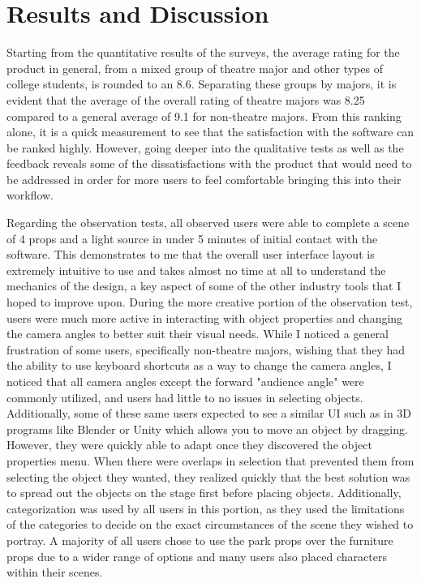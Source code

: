 \documentclass[10pt,twocolumn]{article}
\begin{document}
\section{Results and Discussion}
Starting from the quantitative results of the surveys, the average rating for the product in general, from a mixed group of theatre major and other types of college students, is rounded to an 8.6. Separating these groups by majors, it is evident that the average of the overall rating of theatre majors was 8.25 compared to a general average of 9.1 for non-theatre majors. From this ranking alone, it is a quick measurement to see that the satisfaction with the software can be ranked highly. However, going deeper into the qualitative tests as well as the feedback reveals some of the dissatisfactions with the product that would need to be addressed in order for more users to feel comfortable bringing this into their workflow.

Regarding the observation tests, all observed users were able to complete a scene of 4 props and a light source in under 5 minutes of initial contact with the software. This demonstrates to me that the overall user interface layout is extremely intuitive to use and takes almost no time at all to understand the mechanics of the design, a key aspect of some of the other industry tools that I hoped to improve upon. During the more creative portion of the observation test, users were much more active in interacting with object properties and changing the camera angles to better suit their visual needs. While I noticed a general frustration of some users, specifically non-theatre majors, wishing that they had the ability to use keyboard shortcuts as a way to change the camera angles, I noticed that all camera angles except the forward "audience angle" were commonly utilized, and users had little to no issues in selecting objects. Additionally, some of these same users expected to see a similar UI such as in 3D programs like Blender or Unity which allows you to move an object by dragging. However, they were quickly able to adapt once they discovered the object properties menu. When there were overlaps in selection that prevented them from selecting the object they wanted, they realized quickly that the best solution was to spread out the objects on the stage first before placing objects. Additionally, categorization was used by all users in this portion, as they used the limitations of the categories to decide on the exact circumstances of the scene they wished to portray. A majority of all users chose to use the park props over the furniture props due to a wider range of options and many users also placed characters within their scenes. 
\end{document}
